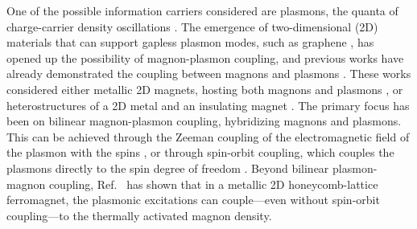 \documentclass[aps,prb,reprint,twocolumns,superscriptaddress,nofootinbib]{revtex4-2}
\begin{document}
	One of the possible information carriers considered are plasmons, the quanta of charge-carrier density oscillations \cite{alonsocalafellQuantumComputingGraphene2019}. 
	The emergence of two-dimensional (2D) materials that can support gapless plasmon modes, such as graphene \cite{hwangDielectricFunctionScreening2007, vafekThermoplasmaPolaritonScaling2006, wangCollectiveExcitationsDirac2007, wunschDynamicalPolarizationGraphene2006,luoPlasmonsGrapheneRecent2013}, has opened up the possibility of magnon-plasmon coupling, and previous works have already demonstrated the coupling between magnons and plasmons \cite{efimkinTopologicalSpinplasmaWaves2021, dyrdalMagnonplasmonHybridizationMediated2023,costaStronglyCoupledMagnonplasmon2023, ghoshPlasmonmagnonInteractionsTwodimensional2023,yuanStrongTunableCoupling2024,yuanBreakingSurfacePlasmonExcitation2024}. These works considered either metallic 2D magnets, hosting both magnons and plasmons \cite{ghoshPlasmonmagnonInteractionsTwodimensional2023,dyrdalMagnonplasmonHybridizationMediated2023}, or heterostructures of a 2D metal and an insulating magnet \cite{efimkinTopologicalSpinplasmaWaves2021,costaStronglyCoupledMagnonplasmon2023,yuanStrongTunableCoupling2024,yuanBreakingSurfacePlasmonExcitation2024}. The primary focus has been on bilinear magnon-plasmon coupling, hybridizing magnons and plasmons. This can be achieved through the Zeeman coupling of the electromagnetic field of the plasmon with the spins \cite{costaStronglyCoupledMagnonplasmon2023,yuanStrongTunableCoupling2024,yuanBreakingSurfacePlasmonExcitation2024}, or through spin-orbit coupling, which couples the plasmons directly to the spin degree of freedom \cite{dyrdalMagnonplasmonHybridizationMediated2023,efimkinTopologicalSpinplasmaWaves2021}. Beyond bilinear plasmon-magnon coupling, Ref.~\cite{ghoshPlasmonmagnonInteractionsTwodimensional2023} has shown that in a metallic 2D honeycomb-lattice ferromagnet, the plasmonic excitations can couple---even without spin-orbit coupling---to the thermally activated magnon density. 
	
	
	
\end{document}
